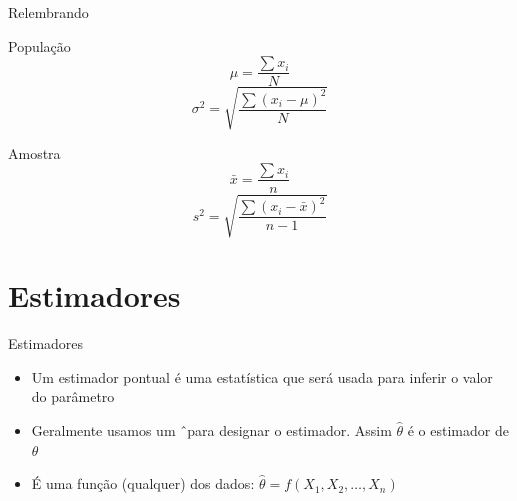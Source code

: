 \documentclass{beamer}
\begin{document}
\begin{frame}{Relembrando}
  \begin{block}{População}
    \begin{displaymath}
      \mu = \frac{\sum x_i}{N}
    \end{displaymath}
    \begin{displaymath}
      \sigma^2 = \sqrt{\frac{\sum (x_i - \mu)^2}{N} }
    \end{displaymath}
  \end{block}
  \begin{block}{Amostra}
    \begin{displaymath}
      \bar{x} = \frac{\sum x_i}{n}
    \end{displaymath}
    \begin{displaymath}
      s^2 = \sqrt{\frac{\sum (x_i - \bar{x})^2}{n-1} }
    \end{displaymath}
  \end{block}
\end{frame}

\section{Estimadores}

\begin{frame}{Estimadores}
  \begin{itemize}
  \item Um \alert{estimador pontual} é uma estatística que será usada
    para inferir o valor do parâmetro
  \item Geralmente usamos um \^\ para designar o estimador. Assim
    $\hat{\theta}$ é o estimador de $\theta$
  \item É uma função (qualquer) dos dados: $\hat{\theta} = f(X_1, X_2, \ldots, X_n)$
  \end{itemize}
\end{frame}
\end{document}

